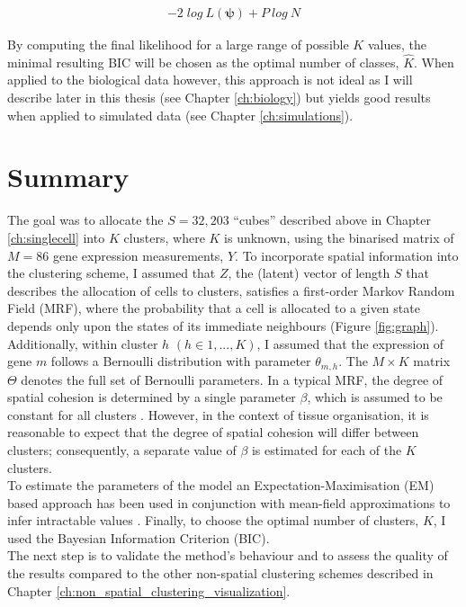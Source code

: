 \begin{align*}
\label{eq:BIC}
- 2\; log\:L(\boldsymbol{\psi}) + P\:log\:N
\end{align*}

By computing the final likelihood for a large range of possible $K$ values, the minimal resulting BIC will be chosen as the optimal number of classes, $\hat{K}$. When applied to the biological data however, this approach is not ideal as I will describe later in this thesis (see Chapter \ref{ch:biology}) but yields good results when applied to simulated data (see Chapter \ref{ch:simulations}).\\

\section{Summary}
The goal was to allocate the $S=32,203$ ``cubes'' described above in Chapter \ref{ch:singlecell} into $K$ clusters, where $K$ is unknown, using the binarised matrix of $M=86$ gene expression measurements, $Y$. To incorporate spatial information into the clustering scheme, I assumed that $Z$, the (latent) vector of length $S$ that describes the allocation of cells to clusters, satisfies a first-order Markov Random Field (MRF), where the probability that a cell is allocated to a given state depends only upon the states of its immediate neighbours (Figure \ref{fig:graph}). Additionally, within cluster $h$ $(h \in {1,...,K})$, I assumed that the expression of gene $m$ follows a Bernoulli distribution with parameter $\theta_{m,h}$. The $M \times K$ matrix  $\Theta$ denotes the full set of Bernoulli parameters. In a typical MRF, the degree of spatial cohesion is determined by a single parameter $\beta$, which is assumed to be constant for all clusters \cite{subudhi14,zhang14}. However, in the context of tissue organisation, it is reasonable to expect that the degree of spatial cohesion will differ between clusters; consequently,  a separate value of $\beta$ is estimated for each of the $K$ clusters.\\

To estimate the parameters of the model an Expectation-Maximisation (EM) based approach has been used in conjunction with mean-field approximations to infer intractable values \cite{Celeux01}. Finally, to choose the optimal number of clusters, $K$, I used the Bayesian Information Criterion (BIC).\\

The next step is to validate the method's behaviour and to assess the quality of the results compared to the other non-spatial clustering schemes described in Chapter \ref{ch:non_spatial_clustering_visualization}.

